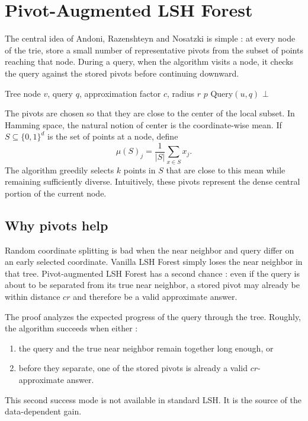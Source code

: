 \documentclass[11pt]{article}
\begin{document}
\section{Pivot-Augmented LSH Forest}

The central idea of Andoni, Razenshteyn and Nosatzki is simple : at every node of the trie, store a small number of representative pivots from the subset of points reaching that node. During a query, when the algorithm visits a node, it checks the query against the stored pivots before continuing downward.

\begin{algorithm}[h]
\caption{Pivot-Augmented Query in One Tree}
\begin{algorithmic}[1]
\Require Tree node $v$, query $q$, approximation factor $c$, radius $r$
        \State \Return $p$
    \EndIf
\EndFor
{}
    \State \Return Query$(u,q)$
\Else
    \State \Return $\bot$
\EndIf
\end{algorithmic}
\end{algorithm}

The pivots are chosen so that they are close to the center of the local subset. In Hamming space, the natural notion of center is the coordinate-wise mean. If $S \subseteq \{0,1\}^d$ is the set of points at a node, define
\[
    \mu(S)_j = \frac{1}{|S|}\sum_{x \in S} x_j.
\]
The algorithm greedily selects $k$ points in $S$ that are close to this mean while remaining sufficiently diverse. Intuitively, these pivots represent the dense central portion of the current node.

\subsection{Why pivots help}

Random coordinate splitting is bad when the near neighbor and query differ on an early selected coordinate. Vanilla LSH Forest simply loses the near neighbor in that tree. Pivot-augmented LSH Forest has a second chance : even if the query is about to be separated from its true near neighbor, a stored pivot may already be within distance $cr$ and therefore be a valid approximate answer.

The proof analyzes the expected progress of the query through the tree. Roughly, the algorithm succeeds when either :
\begin{enumerate}[leftmargin=*]
    \item the query and the true near neighbor remain together long enough, or
    \item before they separate, one of the stored pivots is already a valid $cr$-approximate answer.
\end{enumerate}
This second success mode is not available in standard LSH. It is the source of the data-dependent gain.
\end{document}
